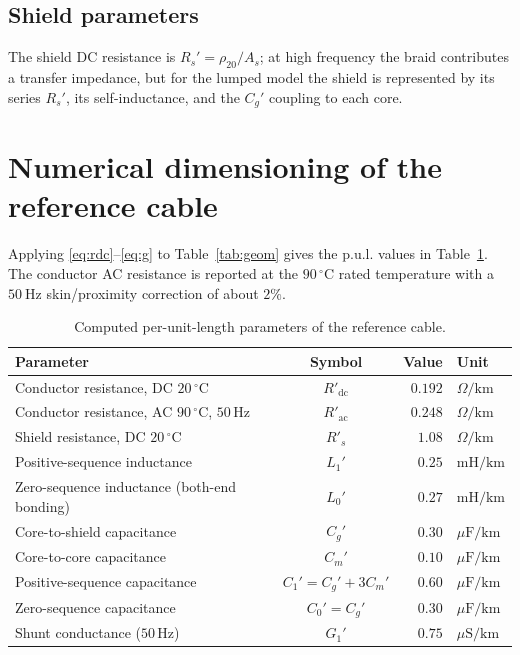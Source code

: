 \documentclass[11pt,a4paper]{article}
\begin{document}
\subsection{Shield parameters}
The shield DC resistance is $R_s'=\rho_{20}/A_s$; at high frequency the braid
contributes a transfer impedance, but for the lumped model the shield is
represented by its series $R_s'$, its self-inductance, and the $C_g'$ coupling to
each core.

\section{Numerical dimensioning of the reference cable}\label{sec:numbers}
Applying \eqref{eq:rdc}--\eqref{eq:g} to Table~\ref{tab:geom} gives the p.u.l.
values in Table~\ref{tab:pul}. The conductor AC resistance is reported at the
$90\,^\circ\mathrm{C}$ rated temperature with a $50\ \mathrm{Hz}$ skin/proximity
correction of about $2\%$.

\begin{table}[h]
\centering
\caption{Computed per-unit-length parameters of the reference cable.}
\label{tab:pul}
\begin{tabular}{@{}lcrl@{}}
\toprule
Parameter & Symbol & Value & Unit \\
\midrule
Conductor resistance, DC $20\,^\circ\mathrm{C}$ & $R'_{\mathrm{dc}}$ & $0.192$ & $\Omega/\mathrm{km}$ \\
Conductor resistance, AC $90\,^\circ\mathrm{C}$, $50\,\mathrm{Hz}$ & $R'_{\mathrm{ac}}$ & $0.248$ & $\Omega/\mathrm{km}$ \\
Shield resistance, DC $20\,^\circ\mathrm{C}$ & $R'_{s}$ & $1.08$ & $\Omega/\mathrm{km}$ \\
Positive-sequence inductance & $L_1'$ & $0.25$ & $\mathrm{mH/km}$ \\
Zero-sequence inductance (both-end bonding) & $L_0'$ & $0.27$ & $\mathrm{mH/km}$ \\
Core-to-shield capacitance & $C_g'$ & $0.30$ & $\mu\mathrm{F/km}$ \\
Core-to-core capacitance & $C_m'$ & $0.10$ & $\mu\mathrm{F/km}$ \\
Positive-sequence capacitance & $C_1'=C_g'+3C_m'$ & $0.60$ & $\mu\mathrm{F/km}$ \\
Zero-sequence capacitance & $C_0'=C_g'$ & $0.30$ & $\mu\mathrm{F/km}$ \\
Shunt conductance ($50\,\mathrm{Hz}$) & $G_1'$ & $0.75$ & $\mu\mathrm{S/km}$ \\
\bottomrule
\end{tabular}
\end{table}
\end{document}
